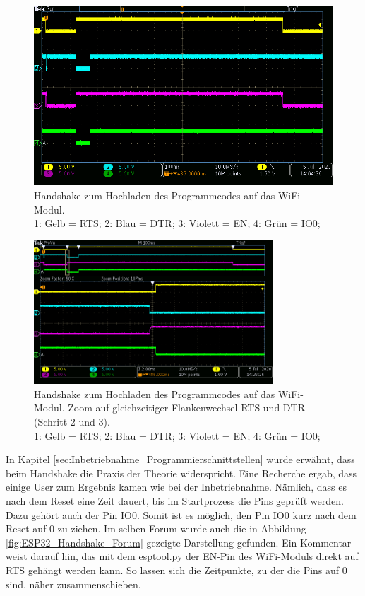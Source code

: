 \begin{figure}[H]
\center
\includegraphics[width = \textwidth]{graphics/ESP32_RTS_DTR_EN_IO0_gesamt}
\caption{Handshake zum Hochladen des Programmcodes auf das WiFi-Modul. \\\hspace{\textwidth}1: Gelb = RTS; 2: Blau = DTR; 3: Violett = EN; 4: Grün = IO0;}
\label{fig:ESP32_RTS_DTR_EN_IO0_gesamt}
\end{figure}

\begin{figure}[H]
\center
\includegraphics[width = 0.8\textwidth]{graphics/ESP32_RTS_DTR_EN_IO0_2}
\caption{Handshake zum Hochladen des Programmcodes auf das WiFi-Modul. Zoom auf gleichzeitiger Flankenwechsel RTS und DTR (Schritt 2 und 3).\\\hspace{\textwidth}1: Gelb = RTS; 2: Blau = DTR; 3: Violett = EN; 4: Grün = IO0;}
\label{fig:ESP32_RTS_DTR_EN_IO0_2}
\end{figure}


In Kapitel \ref{sec:Inbetriebnahme_Programmierschnittstellen} wurde erwähnt, dass beim Handshake die Praxis der Theorie widerspricht. Eine Recherche ergab, dass einige User zum Ergebnis kamen wie bei der Inbetriebnahme. Nämlich, dass es nach dem Reset eine Zeit dauert, bis im Startprozess die Pins geprüft werden. Dazu gehört auch der Pin IO0. Somit ist es möglich, den Pin IO0 kurz nach dem Reset auf 0 zu ziehen.
Im selben Forum wurde auch die in Abbildung \ref{fig:ESP32_Handshake_Forum} gezeigte Darstellung gefunden. Ein Kommentar weist darauf hin, das mit dem esptool.py der EN-Pin des WiFi-Moduls direkt auf RTS gehängt werden kann. So lassen sich die Zeitpunkte, zu der die Pins auf 0 sind, näher zusammenschieben. \cite{liudr_trying_2017}

